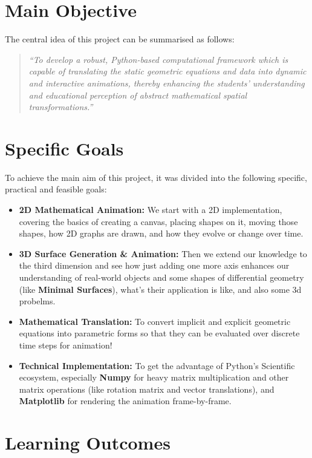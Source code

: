 \documentclass[12pt, a4paper]{report}
\begin{document}
\section{Main Objective}
The central idea of this project can be summarised as follows:

\begin{quote}
\textit{``To develop a robust, Python-based computational framework which is  capable of translating the static geometric equations and data into dynamic and  interactive animations, thereby enhancing the students' understanding and educational perception of abstract mathematical spatial transformations.''}
\end{quote}



\section{Specific Goals}
To achieve the main aim of this project, it was divided into the following specific, practical and feasible goals:

\begin{itemize}
    \item \textbf{2D Mathematical Animation:} We start with a 2D implementation, covering the basics of creating a canvas, placing shapes on it, moving those shapes, how 2D graphs are drawn, and how they evolve or change over time.
    \item \textbf{3D Surface Generation \& Animation:} Then we extend our knowledge to the third dimension and see how just adding one more axis enhances our understanding of real-world objects and some shapes of differential geometry (like \textbf{Minimal Surfaces}), what's their application is like, and also some 3d probelms.
    \item \textbf{Mathematical Translation:} To convert implicit and explicit geometric equations into parametric forms so that they can be evaluated over discrete time steps for animation!
    \item \textbf{Technical Implementation:} To get the advantage of Python's Scientific ecosystem, especially \textbf{Numpy} for heavy matrix multiplication and other matrix operations (like rotation matrix and vector translations), and \textbf{Matplotlib} for rendering the animation frame-by-frame.
\end{itemize}

\section{Learning Outcomes}
\end{document}
